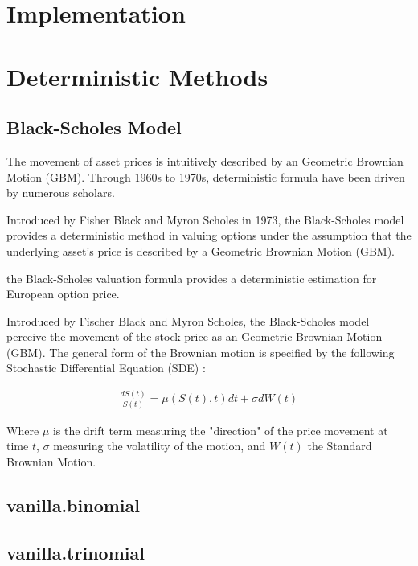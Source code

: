 \section{Implementation} \label{sec:Implementation}

\section{Deterministic Methods}

\subsection{Black-Scholes Model}
The movement of asset prices is intuitively described by an Geometric Brownian Motion (GBM). Through 1960s to 1970s, deterministic formula have been driven by numerous scholars.

Introduced by Fisher Black and Myron Scholes in 1973, the Black-Scholes model provides a deterministic method in valuing options under the assumption that the underlying asset's price is described by a Geometric Brownian Motion (GBM).


the Black-Scholes valuation formula provides a deterministic estimation for European option price.


Introduced by Fischer Black and Myron Scholes, the Black-Scholes model perceive the movement of the stock price as an Geometric Brownian Motion (GBM). The general form of the Brownian motion is specified by the following Stochastic Differential Equation (SDE) \cite{Glasserman2003}:

\begin{align}
\frac{dS(t)}{S(t)} = \mu (S(t), t)dt + \sigma dW(t)
\end{align}

Where $\mu$ is the drift term measuring the "direction" of the price movement at time $t$, $\sigma$ measuring the volatility of the motion, and $W(t)$ the Standard Brownian Motion.



\subsection{vanilla.binomial}




\subsection{vanilla.trinomial}
    


